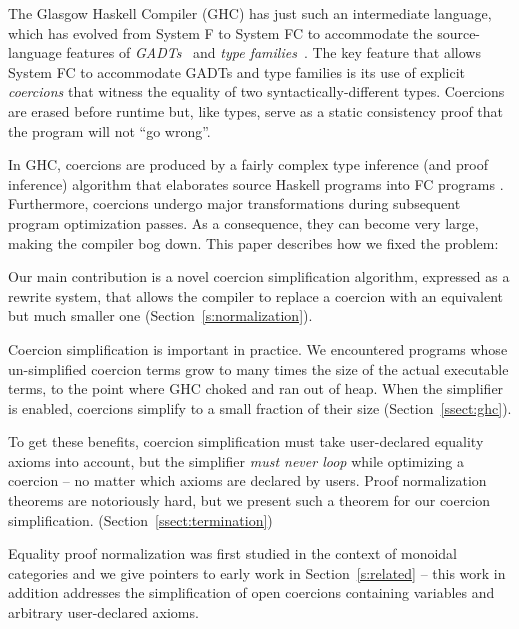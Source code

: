 \documentclass[a4paper,UKenglish]{lipics}
\begin{document}

The Glasgow Haskell Compiler (GHC) has just such an intermediate language,
which has evolved from System F to System FC
\cite{sulzmann+:fc-paper,weirich+:fc2} to accommodate the
source-language features of
\emph{GADTs}~\cite{cheney-hinze:phantom-types,sheard:omega,spj+:gadt}
and \emph{type families}~\cite{Kiselyov09funwith,chak+:synonyms}.
The key feature that allows System FC to accommodate GADTs and type
families is its use of explicit \emph{coercions} that witness the
equality of two syntactically-different types.  Coercions are erased
before runtime but, like types, serve as a static consistency
proof that the program will not ``go wrong''. 

In GHC, coercions are produced by a fairly complex
type inference (and proof inference) algorithm
that elaborates source Haskell programs into FC programs \cite{pjv:modular}. 
Furthermore, coercions undergo major transformations during subsequent program 
optimization passes. As a consequence, they can become very large, 
making the compiler bog down.  This paper describes how we fixed the problem:
\begin{itemize*} 
\item Our main contribution is a novel coercion simplification algorithm, expressed
as a rewrite system, that allows the compiler to replace a coercion
with an equivalent but much smaller one
(Section~\ref{s:normalization}).
     \item Coercion simplification is important in practice.
      We encountered programs whose un-simplified 
      coercion terms grow to many times the size of the actual executable terms, 
      to the point where GHC choked and ran out of heap. When the simplifier
      is enabled, coercions simplify to a small fraction of their
      size (Section~\ref{ssect:ghc}).
     \item To get these benefits, coercion simplification must take user-declared equality axioms 
      into account, but the simplifier {\em must never loop} while optimizing a coercion -- no matter 
      which axioms are declared by users. Proof normalization theorems are notoriously hard, 
      but we present such a theorem for our coercion simplification. (Section~\ref{ssect:termination})
   \end{itemize*}
Equality proof normalization was first studied in the context of monoidal categories and we give 
pointers to early work in Section~\ref{s:related} -- this work in addition addresses the simplification 
of open coercions containing variables and arbitrary user-declared axioms.
\end{document}
